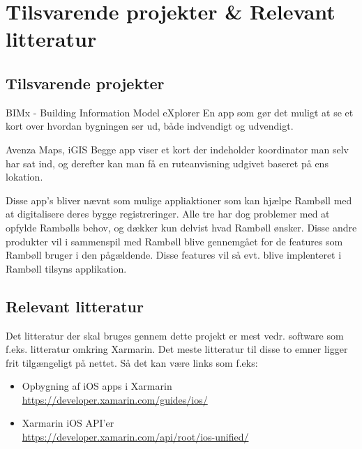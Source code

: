 \chapter{Tilsvarende projekter \& Relevant litteratur}
\section{Tilsvarende projekter}
BIMx - Building Information Model eXplorer
En app som gør det muligt at se et kort over hvordan bygningen ser ud, både indvendigt og udvendigt.

Avenza Maps, iGIS
Begge app viser et kort der indeholder koordinator man selv har sat ind, og derefter kan man få en ruteanvisning udgivet baseret på ens lokation.

Disse app's bliver nævnt som mulige appliaktioner som kan hjælpe Rambøll med at digitalisere deres bygge registreringer. Alle tre har dog problemer med at opfylde Rambølls behov, og dækker kun delvist hvad Rambøll ønsker. \newline
Disse andre produkter vil i sammenspil med Rambøll blive gennemgået for de features som Rambøll bruger i den pågældende. Disse features vil så evt. blive implenteret i Rambøll tilsyns applikation. \\

\section{Relevant litteratur}
Det litteratur der skal bruges gennem dette projekt er mest vedr. software som f.eks. litteratur omkring Xarmarin.
Det meste litteratur til disse to emner ligger frit tilgængeligt på nettet. Så det kan være links som f.eks:
\begin{itemize}
	\item Opbygning af iOS apps i Xarmarin \\
	\url{https://developer.xamarin.com/guides/ios/}
	\item Xarmarin iOS API'er \\
	\url{https://developer.xamarin.com/api/root/ios-unified/}

\end{itemize} 


